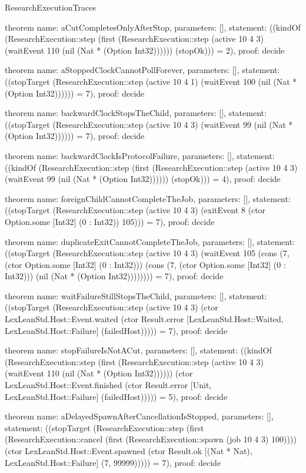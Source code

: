 \begin{lexlean}{ResearchExecutionTraces}
\begin{semanticmodule}
theorem{
  name: aCutCompletesOnlyAfterStop,
  parameters: [],
  statement: ((kindOf (ResearchExecution::step (first (ResearchExecution::step (active 10 4 3) (waitEvent 110 (nil (Nat * (Option Int32)))))) (stopOk))) = 2),
  proof: decide{}
}

theorem{
  name: aStoppedClockCannotPollForever,
  parameters: [],
  statement: ((stopTarget (ResearchExecution::step (active 10 4 1) (waitEvent 100 (nil (Nat * (Option Int32)))))) = 7),
  proof: decide{}
}

theorem{
  name: backwardClockStopsTheChild,
  parameters: [],
  statement: ((stopTarget (ResearchExecution::step (active 10 4 3) (waitEvent 99 (nil (Nat * (Option Int32)))))) = 7),
  proof: decide{}
}

theorem{
  name: backwardClockIsProtocolFailure,
  parameters: [],
  statement: ((kindOf (ResearchExecution::step (first (ResearchExecution::step (active 10 4 3) (waitEvent 99 (nil (Nat * (Option Int32)))))) (stopOk))) = 4),
  proof: decide{}
}

theorem{
  name: foreignChildCannotCompleteTheJob,
  parameters: [],
  statement: ((stopTarget (ResearchExecution::step (active 10 4 3) (exitEvent 8 (ctor Option.some [Int32] (0 : Int32)) 105))) = 7),
  proof: decide{}
}

theorem{
  name: duplicateExitCannotCompleteTheJob,
  parameters: [],
  statement: ((stopTarget (ResearchExecution::step (active 10 4 3) (waitEvent 105 (cons (7, (ctor Option.some [Int32] (0 : Int32))) (cons (7, (ctor Option.some [Int32] (0 : Int32))) (nil (Nat * (Option Int32)))))))) = 7),
  proof: decide{}
}

theorem{
  name: waitFailureStillStopsTheChild,
  parameters: [],
  statement: ((stopTarget (ResearchExecution::step (active 10 4 3) (ctor LexLeanStd.Host::Event.waited (ctor Result.error [LexLeanStd.Host::Waited, LexLeanStd.Host::Failure] (failedHost))))) = 7),
  proof: decide{}
}

theorem{
  name: stopFailureIsNotACut,
  parameters: [],
  statement: ((kindOf (ResearchExecution::step (first (ResearchExecution::step (active 10 4 3) (waitEvent 110 (nil (Nat * (Option Int32)))))) (ctor LexLeanStd.Host::Event.finished (ctor Result.error [Unit, LexLeanStd.Host::Failure] (failedHost))))) = 5),
  proof: decide{}
}

theorem{
  name: aDelayedSpawnAfterCancellationIsStopped,
  parameters: [],
  statement: ((stopTarget (ResearchExecution::step (first (ResearchExecution::cancel (first (ResearchExecution::spawn (job 10 4 3) 100)))) (ctor LexLeanStd.Host::Event.spawned (ctor Result.ok [(Nat * Nat), LexLeanStd.Host::Failure] (7, 99999))))) = 7),
  proof: decide{}
}


\end{semanticmodule}
\end{lexlean}

